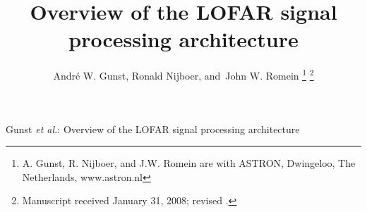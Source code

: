 \documentclass[journal]{IEEEtran}
\begin{document}
%
\title{Overview of the LOFAR signal processing architecture}
%
%
%

\author{Andr\'{e} W. Gunst,
        Ronald Nijboer,
        and~John W. Romein%
\thanks{A. Gunst, R. Nijboer, and J.W. Romein are with ASTRON, Dwingeloo, 
The Netherlands, www.astron.nl
}%
\thanks{Manuscript received January 31, 2008; revised .}}

% 
%



%
{Gunst \MakeLowercase{\textit{et al.}}: Overview of the LOFAR signal processing architecture}
% 
\end{document}
